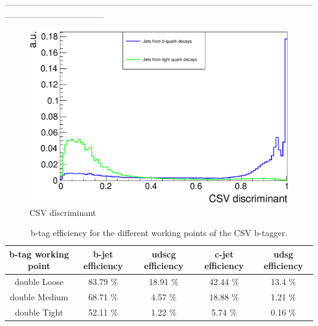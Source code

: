 -----------------------------------------------------------------------------------------------------------------------------------------------
\\


\begin{figure}[h!t]
 \centering
 \includegraphics[width = 0.85 \textwidth]{Chapters/Chapter4_EvtSel/Figures/CSVDiscr_LightAndBJets.pdf}
 \caption{CSV discriminant} \label{fig::CSVDiscr}
\end{figure}

\begin{table}[h!t]
 \centering
 \caption{b-tag efficiency for the different working points of the CSV b-tagger.}
 \begin{tabular}{c|c|c|c|c}
  b-tag working point 	& b-jet efficiency 	& udscg efficiency 	& c-jet efficiency 	& udsg efficiency 	\\
  \hline
  double Loose 		& 83.79 $\%$		& 18.91 $\%$		& 42.44 $\%$ 		& 13.4 $\%$		\\
  double Medium 	& 68.71 $\%$		& 4.57 $\%$		& 18.88 $\%$		& 1.21 $\%$		\\
  double Tight 		& 52.11 $\%$ 		& 1.22 $\%$ 		& 5.74 $\%$ 		& 0.16 $\%$ 		\\
 \end{tabular}
\end{table}


